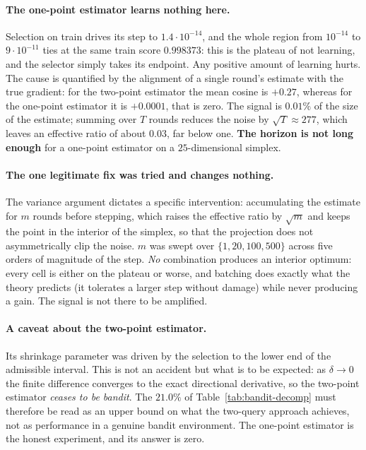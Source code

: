 \documentclass[12pt,a4paper,oneside]{report}
\renewcommand{\_}{\oldunderscore\allowbreak}
\theoremstyle{definition}
\theoremstyle{plain}
\theoremstyle{definition}   %
\begin{document}
\paragraph{The one-point estimator learns nothing here.} Selection on train drives its step to
$1.4\cdot10^{-14}$, and the whole region from $10^{-14}$ to $9\cdot10^{-11}$ ties at the same
train score $0.998373$: this is the plateau of not learning, and the selector simply takes its
endpoint. Any positive amount of learning hurts. The cause is quantified by the alignment of a
single round's estimate with the true gradient: for the two-point estimator the mean cosine is
$+0.27$, whereas for the one-point estimator it is $+0.0001$, that is zero. The signal is $0.01\%$
of the size of the estimate; summing over $T$ rounds reduces the noise by $\sqrt{T}\approx277$,
which leaves an effective ratio of about $0.03$, far below one. \textbf{The horizon is not
long enough} for a one-point estimator on a $25$-dimensional simplex.

\paragraph{The one legitimate fix was tried and changes nothing.} The variance argument dictates a
specific intervention: accumulating the estimate for $m$ rounds before stepping, which raises the
effective ratio by $\sqrt{m}$ and keeps the point in the interior of the simplex, so that the
projection does not asymmetrically clip the noise. $m$ was swept over $\{1,20,100,500\}$ across
five orders of magnitude of the step. \emph{No} combination produces an interior optimum: every
cell is either on the plateau or worse, and batching does exactly what the theory predicts (it
tolerates a larger step without damage) while never producing a gain. The signal is not there
to be amplified.

\paragraph{A caveat about the two-point estimator.} Its shrinkage parameter was driven by the
selection to the lower end of the admissible interval. This is not an accident but what is to be
expected: as $\delta\to 0$ the finite difference converges to the exact directional derivative, so
the two-point estimator \emph{ceases to be bandit}. The $21.0\%$ of Table~\ref{tab:bandit-decomp}
must therefore be read as an upper bound on what the two-query approach achieves, not as
performance in a genuine bandit environment. The one-point estimator is the honest experiment, and
its answer is zero.
\end{document}
